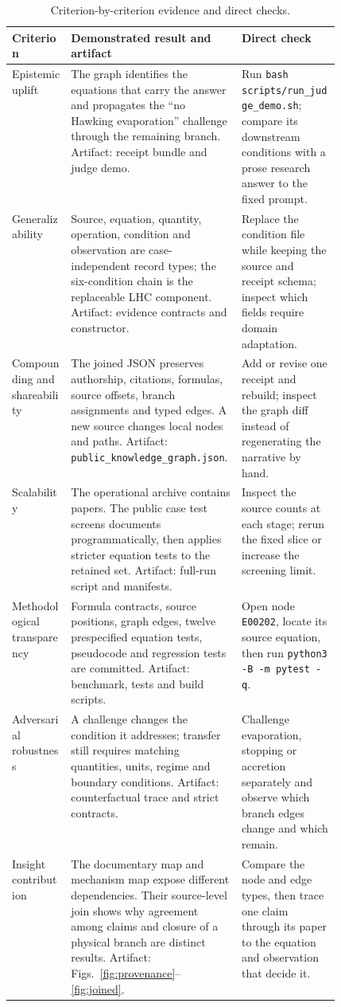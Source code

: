 \documentclass[10pt]{article}
\begin{document}
\begin{table}[H]
\centering
\small
\caption{Criterion-by-criterion evidence and direct checks.}
\begin{tabularx}{\linewidth}{P{0.18\linewidth}Y P{0.30\linewidth}}
\toprule
Criterion & Demonstrated result and artifact & Direct check \\
\midrule
Epistemic uplift & The graph identifies the equations that carry the answer and propagates the ``no Hawking evaporation'' challenge through the remaining branch. Artifact: receipt bundle and judge demo. & Run \texttt{bash scripts/run\_judge\_demo.sh}; compare its downstream conditions with a prose research answer to the fixed prompt. \\
Generalizability & Source, equation, quantity, operation, condition and observation are case-independent record types; the six-condition chain is the replaceable LHC component. Artifact: evidence contracts and constructor. & Replace the condition file while keeping the source and receipt schema; inspect which fields require domain adaptation. \\
Compounding and shareability & The joined JSON preserves authorship, citations, formulas, source offsets, branch assignments and typed edges. A new source changes local nodes and paths. Artifact: \texttt{public\_knowledge\_graph.json}. & Add or revise one receipt and rebuild; inspect the graph diff instead of regenerating the narrative by hand. \\
Scalability & The operational archive contains \GlobalArchiveDocuments{} papers. The public case test screens \DocumentsScreened{} documents programmatically, then applies stricter equation tests to the retained set. Artifact: full-run script and manifests. & Inspect the source counts at each stage; rerun the fixed slice or increase the screening limit. \\
Methodological transparency & Formula contracts, source positions, graph edges, twelve prespecified equation tests, pseudocode and regression tests are committed. Artifact: benchmark, tests and build scripts. & Open node \texttt{E00202}, locate its source equation, then run \texttt{python3 -B -m pytest -q}. \\
Adversarial robustness & A challenge changes the condition it addresses; transfer still requires matching quantities, units, regime and boundary conditions. Artifact: counterfactual trace and strict contracts. & Challenge evaporation, stopping or accretion separately and observe which branch edges change and which remain. \\
Insight contribution & The documentary map and mechanism map expose different dependencies. Their source-level join shows why agreement among claims and closure of a physical branch are distinct results. Artifact: Figs.~\ref{fig:provenance}--\ref{fig:joined}. & Compare the node and edge types, then trace one claim through its paper to the equation and observation that decide it. \\
\bottomrule
\end{tabularx}
\end{table}
\end{document}
